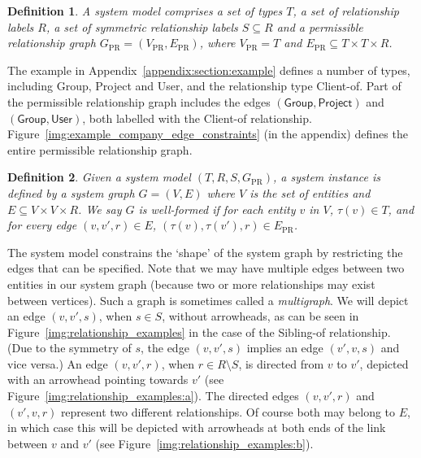 \documentclass{article}
\newtheorem{definition}{Definition}
\begin{document}
\begin{definition}
    A \emph{system model} comprises a set of types $T$, a set of relationship labels $R$, a set of \emph{symmetric} relationship labels $S \subseteq R$ and a \emph{permissible relationship graph} $G_{\textrm{PR}} = (V_{\textrm{PR}},E_{\textrm{PR}})$, where $V_{\textrm{PR}} = T$ and $E_{\textrm{PR}} \subseteq T \times T \times R$.
\end{definition}

The example in Appendix~\ref{appendix:section:example} defines a number of types, including \textsf{Group}, \textsf{Project} and \textsf{User}, and the relationship type \textsf{Client-of}.
Part of the permissible relationship graph includes the edges $(\textsf{Group}, \textsf{Project})$ and $(\textsf{Group}, \textsf{User})$, both labelled with the \textsf{Client-of} relationship.
Figure~\ref{img:example_company_edge_constraints} (in the appendix) defines the entire permissible relationship graph.

\begin{definition}
    Given a system model $(T,R,S,G_{\textrm{PR}})$, a \emph{system instance} is defined by a \emph{system graph} $G = (V,E)$ where $V$ is the set of entities and $E \subseteq V \times V \times R$.
    We say $G$ is \emph{well-formed} if for each entity $v$ in $V$, $\tau(v) \in T$, and for every edge $(v,v',r) \in E$, $(\tau(v),\tau(v'),r) \in E_{\textrm{PR}}$.
\end{definition}

The system model constrains the `shape' of the system graph by restricting the edges that can be specified.
Note that we may have multiple edges between two entities in our system graph (because two or more relationships may exist between vertices).
Such a graph is sometimes called a \emph{multigraph}.
We will depict an edge $(v,v',s)$, when $s \in S$, without arrowheads, as can be seen in Figure~\ref{img:relationship_examples} in the case of the \textsf{Sibling-of} relationship.
(Due to the symmetry of $s$, the edge $(v,v',s)$ implies an edge $(v',v,s)$ and vice versa.)
An edge $(v,v',r)$, when $r \in R \setminus S$, is directed from $v$ to $v'$, depicted with an arrowhead pointing towards $v'$ (see Figure~\ref{img:relationship_examples:a}).
The directed edges $(v,v',r)$ and $(v',v,r)$ represent two different relationships. Of course both may belong to $E$, in which case this will be depicted with arrowheads at both ends of the link between $v$ and $v'$ (see Figure~\ref{img:relationship_examples:b}).
\end{document}
